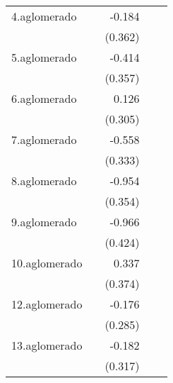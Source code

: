 {\begin{longtable}{l*{4}{D{.}{.}{-1}}}
\addlinespace
4.aglomerado&                     &      -0.184         &                     &                     \\
            &                     &     (0.362)         &                     &                     \\
\addlinespace
5.aglomerado&                     &      -0.414         &                     &                     \\
            &                     &     (0.357)         &                     &                     \\
\addlinespace
6.aglomerado&                     &       0.126         &                     &                     \\
            &                     &     (0.305)         &                     &                     \\
\addlinespace
7.aglomerado&                     &      -0.558         &                     &                     \\
            &                     &     (0.333)         &                     &                     \\
\addlinespace
8.aglomerado&                     &      -0.954\sym{**} &                     &                     \\
            &                     &     (0.354)         &                     &                     \\
\addlinespace
9.aglomerado&                     &      -0.966\sym{*}  &                     &                     \\
            &                     &     (0.424)         &                     &                     \\
\addlinespace
10.aglomerado&                     &       0.337         &                     &                     \\
            &                     &     (0.374)         &                     &                     \\
\addlinespace
12.aglomerado&                     &      -0.176         &                     &                     \\
            &                     &     (0.285)         &                     &                     \\
\addlinespace
13.aglomerado&                     &      -0.182         &                     &                     \\
            &                     &     (0.317)         &                     &                     \\

\end{longtable}}
